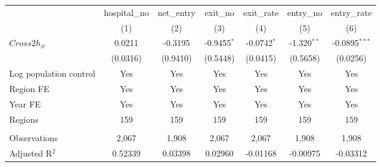 \begingroup
\centering
\begin{tabular}{lcccccc}
   \toprule
                          & hospital\_no  & net\_entry  & exit\_no      & exit\_rate    & entry\_no     & entry\_rate \\    
                          & (1)           & (2)         & (3)           & (4)           & (5)           & (6)\\  
   \midrule 
   $Cross2h_{it}$         & 0.0211        & -0.3195     & -0.9455$^{*}$ & -0.0742$^{*}$ & -1.320$^{**}$ & -0.0895$^{***}$\\   
                          & (0.0316)      & (0.9410)    & (0.5448)      & (0.0415)      & (0.5658)      & (0.0256)\\   
   Log population control & Yes           & Yes         & Yes           & Yes           & Yes           & Yes\\  
   Region FE              & Yes           & Yes         & Yes           & Yes           & Yes           & Yes\\  
   Year FE                & Yes           & Yes         & Yes           & Yes           & Yes           & Yes\\  
   Regions                & 159           & 159         & 159           & 159           & 159           & 159\\  
    \\
   Observations           & 2,067         & 1,908       & 2,067         & 2,067         & 1,908         & 1,908\\  
   Adjusted R$^2$         & 0.52339       & 0.03398     & 0.02960       & -0.01168      & -0.00975      & -0.03312\\  
   \bottomrule
\end{tabular}
\par\endgroup
